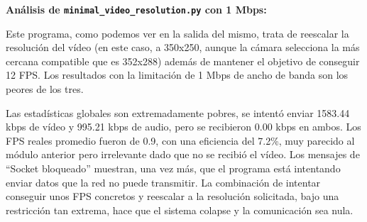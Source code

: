 \vspace{\baselineskip}

\textbf{Análisis de \texttt{minimal\_video\_resolution.py} con 1 Mbps:}
\vspace{\baselineskip}

Este programa, como podemos ver en la salida del mismo, trata de reescalar la resolución del vídeo (en este caso, a 350x250, aunque la cámara selecciona la más cercana compatible que es 352x288) además de mantener el objetivo de conseguir 12 FPS. Los resultados con la limitación de 1 Mbps de ancho de banda son los peores de los tres.
\vspace{\baselineskip}

Las estadísticas globales son extremadamente pobres, se intentó enviar 1583.44 kbps de vídeo y 995.21 kbps de audio, pero se recibieron 0.00 kbps en ambos. Los FPS reales promedio fueron de 0.9, con una eficiencia del 7.2\%, muy parecido al módulo anterior pero irrelevante dado que no se recibió el vídeo. Los mensajes de ``Socket bloqueado'' muestran, una vez más, que el programa está intentando enviar datos que la red no puede transmitir. La combinación de intentar conseguir unos FPS concretos y reescalar a la resolución solicitada, bajo una restricción tan extrema, hace que el sistema colapse y la comunicación sea nula.

\vspace{\baselineskip}

